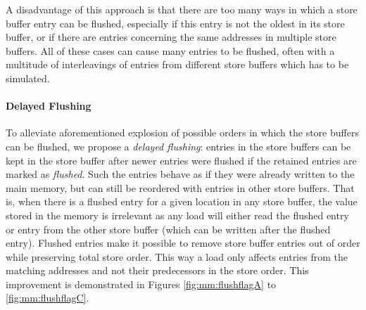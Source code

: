 A disadvantage of this approach is that there are too many ways in which a store
buffer entry can be flushed, especially if this entry is not the oldest in its
store buffer, or if there are entries concerning the same addresses in multiple store buffers.
All of these cases can cause many entries to be flushed, often with a multitude of interleavings of entries from different store buffers which has to be simulated.

\paragraph{Delayed Flushing} %
To alleviate aforementioned explosion of possible orders in which the store
buffers can be flushed, we propose a \emph{delayed flushing}: entries in the
store buffers can be kept in the store buffer after newer entries were flushed
if the retained entries are marked as \emph{flushed}.
Such the entries behave as if they were already written to the main memory, but can still be reordered with entries in other store buffers.
That is, when there is a flushed entry for a given location in any store buffer, the value stored in the memory is irrelevant as any load will either read the flushed entry or entry from the other store buffer (which can be written after the flushed entry).
Flushed entries make it possible to remove store buffer entries out of order while preserving total store order.
This way a load only affects entries from the matching addresses and not their predecessors in the store order.
This improvement is demonstrated in Figures \ref{fig:mm:flushflagA} to \ref{fig:mm:flushflagC}.


